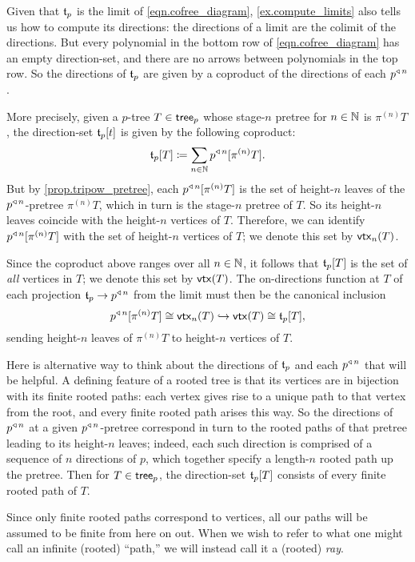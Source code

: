 \documentclass[Book-Poly]{subfiles}
\begin{document}
Given that $\mathfrak{t}_p$ is the limit of \eqref{eqn.cofree_diagram}, \cref{ex.compute_limits} also tells us how to compute its directions: the directions of a limit are the colimit of the directions.
But every polynomial in the bottom row of \eqref{eqn.cofree_diagram} has an empty direction-set, and there are no arrows between polynomials in the top row.
So the directions of $\mathfrak{t}_p$ are given by a coproduct of the directions of each $p^{\mathbin{\triangleleft}\,n}$.

More precisely, given a $p$-tree $T\in\mathsf{tree}_p$ whose stage-$n$ pretree for $n\in\mathbb{N}$ is $\pi^{(n)}T$, the direction-set $\mathfrak{t}_p[t]$ is given by the following coproduct:
\[
    \mathfrak{t}_p[T]\coloneqq\sum_{n\in\mathbb{N}}p^{\mathbin{\triangleleft}\,n}[\pi^{(n)}T].
\]
But by \cref{prop.tripow_pretree}, each $p^{\mathbin{\triangleleft}\,n}[\pi^{(n)}T]$ is the set of height-$n$ leaves of the $p^{\mathbin{\triangleleft}\,n}$-pretree $\pi^{(n)}T$, which in turn is the stage-$n$ pretree of $T$.
So its height-$n$ leaves coincide with the height-$n$ vertices of $T$.
Therefore, we can identify $p^{\mathbin{\triangleleft}\,n}[\pi^{(n)}T]$ with the set of height-$n$ vertices of $T$; we denote this set by $\mathsf{vtx}_n(T)$.

Since the coproduct above ranges over all $n\in\mathbb{N}$, it follows that $\mathfrak{t}_p[T]$ is the set of \emph{all} vertices in $T$; we denote this set by $\mathsf{vtx}(T)$.
The on-directions function at $T$ of each projection $\mathfrak{t}_p\to p^{\mathbin{\triangleleft}\,n}$ from the limit must then be the canonical inclusion
\[
    p^{\mathbin{\triangleleft}\,n}[\pi^{(n)}T]\cong \mathsf{vtx}_n(T)\hookrightarrow \mathsf{vtx}(T)\cong\mathfrak{t}_p[T],
\]
sending height-$n$ leaves of $\pi^{(n)}T$ to height-$n$ vertices of $T$.

Here is alternative way to think about the directions of $\mathfrak{t}_p$ and each $p^{\mathbin{\triangleleft}\,n}$ that will be helpful.
A defining feature of a rooted tree is that its vertices are in bijection with its finite rooted paths: each vertex gives rise to a unique path to that vertex from the root, and every finite rooted path arises this way.
So the directions of $p^{\mathbin{\triangleleft}\,n}$ at a given $p^{\mathbin{\triangleleft}\,n}$-pretree correspond in turn to the rooted paths of that pretree leading to its height-$n$ leaves; indeed, each such direction is comprised of a sequence of $n$ directions of $p$, which together specify a length-$n$ rooted path up the pretree.
Then for $T\in\mathsf{tree}_p$, the direction-set $\mathfrak{t}_p[T]$ consists of every finite rooted path of $T$.

Since only finite rooted paths correspond to vertices, all our paths will be assumed to be finite from here on out.
When we wish to refer to what one might call an infinite (rooted) ``path,'' we will instead call it a (rooted) \emph{ray}.
\end{document}
